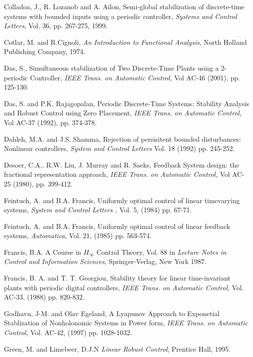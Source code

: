 \begin{thebibliography}{99}
Colladoa, J., R. Lozanob and A. Ailon, Semi-global stabilization of
discrete-time systems with bounded inputs using a periodic
controller, {\em Systems and Control Letters}, Vol. 36, pp.
267-275, 1999.


Cotlar, M.  and R.Cignoli,  {\em
An Introduction to  Functional Analysis}, North Holland Publishing
Company, 1974.


 Das, S., Simultaneous  stabilization of  Two Discrete-Time
 Plants using   a 2-periodic Controller, {\it IEEE Trans. on Automatic Control,} Vol
AC-46 (2001), pp. 125-130.


 Das, S. and  P.K. Rajagopalan, Periodic Discrete-Time Systems:
Stability  Analysis and  Robust  Control  using Zero Placement, {\it IEEE Trans. on
Automatic Control,} Vol AC-37 (1992), pp. 374-378.


Dahleh, M.A.  and J.S. Shamma, Rejection of  persisitent  bounded disturbances:
Nonlinear  controllers, {\em System  and Control Letters }  Vol. 18 (1992)
 pp.  245-252.


 Desoer, C.A.. R.W. Liu, J. Murray and  R. Saeks, Feedback  System
design: the  fractional  representation  approach, {\it IEEE Trans. on Automatic
Control,} Vol AC-25 (1980), pp. 399-412.



Feintuch, A. and B.A. Francis, Uniformly optimal control
of linear timevarying  systems,  {\em
System  and  Control Letters ,} Vol. 5, (1984) pp. 67-71.

Feintuch, A. and B.A. Francis, Uniformly optimal control
of linear feedback systems, {\em Automatica}, Vol. 21,
(1985) pp. 563-574.

Francis, B.A.  A Course  in  $H_\infty$ Control  Theory, Vol. 88 in
 {\em Lecture  Notes in Control  and  Information Sciences}, Springer-Verlag, New
 York
1987.

Francis, B. A. and T. T. Georgiou, Stability theory
for linear time-invariant plants with periodic digital
controllers, {\em IEEE Trans. on Automatic Control,} Vol. AC-33,
(1988) pp. 820-832.


Godhavn, J-M.  and Olav Egeland, A Lyapunov Approach to Exponetial
Stablization of Nonholonomic Systems in Power  form, {\em IEEE Trans. on
Automatic Control,} Vol. AC-42, (1997) pp. 1028-1032.


Green, M. and  Limebeer, D.J.N {\em Linear Robust  Control}, Prentice  Hall, 1995.


\end{thebibliography}
